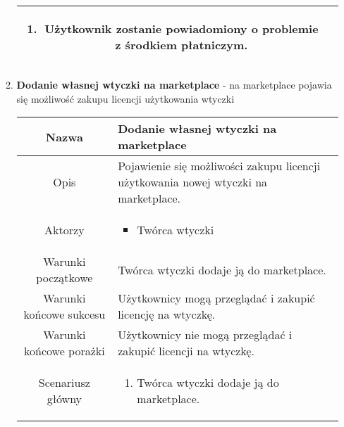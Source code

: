 \documentclass{article}
\begin{document}
\begin{enumerate}
\begin{enumerate}
\begin{table}[H]
\begin{tabular}{|c|p{7cm}|}
\begin{enumerate}
\item Użytkownik zostanie powiadomiony o problemie z środkiem płatniczym.\end{enumerate}                         \\
						\hline
					\end{tabular}
				\end{table}

			\item \textbf{Dodanie własnej wtyczki na marketplace} - na marketplace
				pojawia się możliwość zakupu licencji użytkowania wtyczki
				\begin{table}[H]
					\centering
					\begin{tabular}{|c|p{7cm}|}
						\hline
						Nazwa                   & \textbf{Dodanie własnej wtyczki na marketplace}                                                                                                                                                                              \\
						\hline
						Opis                    & Pojawienie się możliwości zakupu licencji użytkowania nowej wtyczki na marketplace.                                                                                                                                          \\
						\hline
						Aktorzy                 & \begin{itemize}\item Twórca wtyczki\end{itemize}                                                                                                                                                                             \\
						\hline
						Warunki początkowe      & Twórca wtyczki dodaje ją do marketplace.                                                                                                                                                                                     \\
						\hline
						Warunki końcowe sukcesu & Użytkownicy mogą przeglądać i zakupić licencję na wtyczkę.                                                                                                                                                                   \\
						\hline
						Warunki końcowe porażki & Użytkownicy nie mogą przeglądać i zakupić licencji na wtyczkę.                                                                                                                                                               \\
						\hline
						Scenariusz główny       & \begin{enumerate}\item Twórca wtyczki dodaje ją do marketplace.


\end{enumerate}
\end{tabular}
\end{table}
\end{enumerate}
\end{enumerate}
\end{document}
